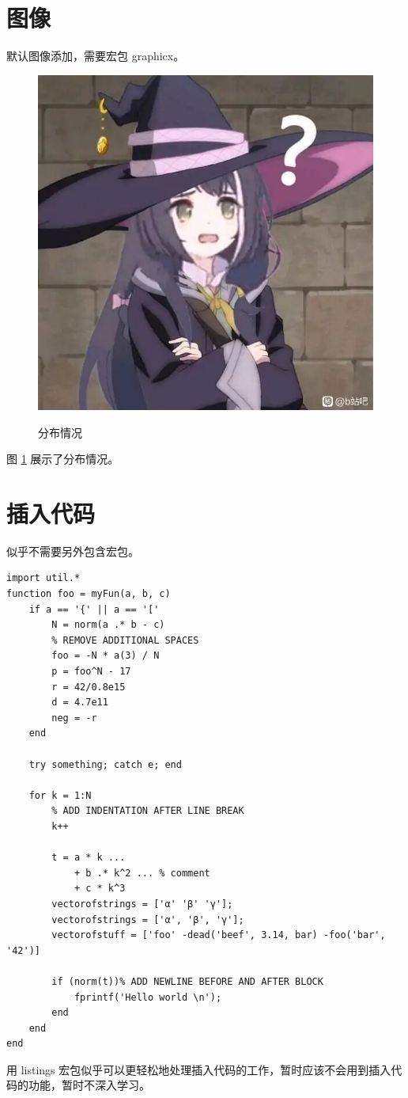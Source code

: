 \documentclass[UTF8]{ctexart}
\begin{document}
\newpage
\section{图像}
默认图像添加，需要宏包 graphicx。
\begin{figure}[htb]
    \centering
    \caption{分布情况}
    \includegraphics[width=5 cm]{test.jpg}
    \label{fig:dist}
\end{figure}

图 \ref{fig:dist} 展示了分布情况。

\newpage
\section{插入代码}
似乎不需要另外包含宏包。
\begin{verbatim}
import util.*
function foo = myFun(a, b, c)
    if a == '{' || a == '['
        N = norm(a .* b - c)
        % REMOVE ADDITIONAL SPACES
        foo = -N * a(3) / N
        p = foo^N - 17
        r = 42/0.8e15
        d = 4.7e11
        neg = -r
    end

    try something; catch e; end

    for k = 1:N
        % ADD INDENTATION AFTER LINE BREAK
        k++

        t = a * k ...
            + b .* k^2 ... % comment
            + c * k^3
        vectorofstrings = ['α' 'β' 'γ'];
        vectorofstrings = ['α', 'β', 'γ'];
        vectorofstuff = ['foo' -dead('beef', 3.14, bar) -foo('bar', '42')]

        if (norm(t))% ADD NEWLINE BEFORE AND AFTER BLOCK
            fprintf('Hello world \n');
        end
    end
end
\end{verbatim}

用 listings 宏包似乎可以更轻松地处理插入代码的工作，暂时应该不会用到插入代码的功能，暂时不深入学习。



\end{document}
